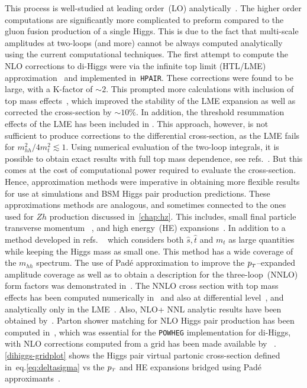 This process is well-studied at leading order~(LO) analytically~\cite{EBOLI1987269,GLOVER1988282,DICUS1988457,Plehn:1996wb}.  The higher order computations are significantly more complicated to preform compared to the gluon fusion production of a single Higgs. This is due to the fact that multi-scale amplitudes at two-loops (and more) cannot be always computed analytically using the current computational techniques.  The first attempt to compute the NLO corrections to di-Higgs were via the infinite top limit (HTL/LME)  approximation~\cite{Dawson:1998py, Altenkamp:2012sx,Grigo:2014jma} and implemented in~\texttt{HPAIR}. These corrections were found to be large, with a K-factor of $ \sim 2$.  This prompted more calculations with inclusion of top mass effects~\cite{deFlorian:2013uza,Grigo:2013rya,Maltoni:2014eza,Grigo:2015dia,Degrassi:2016vss}, which improved the stability of the LME expansion as well as corrected the cross-section by $\sim 10\%$. In addition, the threshold resummation effects of the LME has been included in \cite{Shao:2013bz}. This approach, however, is not sufficient to produce corrections to the differential cross-section, as the LME fails for $m_{hh}^2/4m_t^2 \lesssim 1$. Using numerical evaluation of the two-loop integrals, it is possible to obtain exact results with full top mass dependence, see refs.~\cite{Borowka:2016ypz,Borowka:2016ehy,Baglio:2018lrj}. But this comes at the cost of computational power required to evaluate the cross-section.  Hence, approximation methods were imperative in obtaining more flexible results for use at simulations and BSM Higgs pair production predictions.  These approximations methods are analogous, and sometimes connected  to the ones used for $Zh$ production discussed in~\autoref{chap:hz}. This includes, small final particle transverse momentum ~\cite{Bonciani:2018omm}, and high energy~(HE) expansions~\cite{Davies:2018ood,Davies:2018qvx}. In addition to a method developed in refs. ~\cite{Xu:2018eos,Wang:2020nnr} which considers both $\hat s , \hat t$ and $m_t$ as large quantities while keeping the Higgs mass as small one. This method has a wide coverage of the $m_{hh}$ spectrum.  The use of Pad\'e approximation to improve the $p_{\scriptscriptstyle T}$--expanded amplitude coverage as well as to obtain a description for the three-loop~(NNLO) form factors was demonstrated in~\cite{Davies:2019nhm}. The NNLO cross section with top mass effects has been computed numerically in~\cite{Grazzini:2018bsd} and also at differential level~\cite{deFlorian:2016uhr}, and analytically only in the LME~\cite{deFlorian:2013jea}. Also, NLO+ NNL analytic results have been obtained by~\cite{deFlorian:2015moa}. Parton shower matching for NLO Higgs pair production has been computed  in~\cite{Jones:2017giv,Heinrich:2019bkc}, which was essential for the \texttt{POWHEG} implementation for di-Higgs, with NLO corrections computed from a grid has been made available by ~\cite{Heinrich:2017kxx,Heinrich:2019bkc,Heinrich:2020ckp}. \autoref{dihiggs-gridplot} shows the Higgs pair virtual partonic cross-section defined in~eq.\eqref{eq:deltasigma} vs the  $p_{\scriptscriptstyle T}$ and HE expansions bridged using Pad\'e  approximants~. \\
